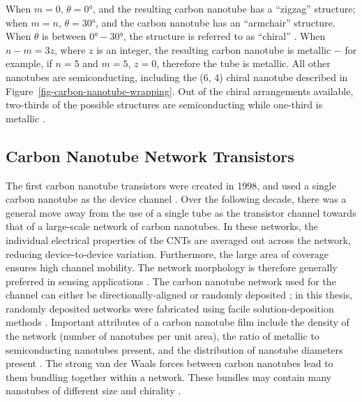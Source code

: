 \documentclass[
  a4paper,
]{scrbook}
\begin{document}
When \(m= 0\), \(\theta = 0°\), and the resulting carbon nanotube has a
``zigzag'' structure; when \(m = n\), \(\theta = 30°\), and the carbon
nanotube has an ``armchair'' structure. When \(\theta\) is between
\(0°-30°\), the structure is referred to as ``chiral''
\autocite{Dekker1999,Lu2012}. When \(n-m = 3z\), where \(z\) is an
integer, the resulting carbon nanotube is metallic \(-\) for example, if
\(n=5\) and \(m=5\), \(z=0\), therefore the tube is metallic. All other
nanotubes are semiconducting, including the (6, 4) chiral nanotube
described in Figure~\ref{fig-carbon-nanotube-wrapping}. Out of the
chiral arrangements available, two-thirds of the possible structures are
semiconducting while one-third is metallic \autocite{Dekker1999}.

\hypertarget{sec-cnt-network-details}{%
\subsection{Carbon Nanotube Network
Transistors}\label{sec-cnt-network-details}}

The first carbon nanotube transistors were created in 1998, and used a
single carbon nanotube as the device channel
\autocite{Martel1998,Tans1998,Kauffman2008}. Over the following decade,
there was a general move away from the use of a single tube as the
transistor channel towards that of a large-scale network of carbon
nanotubes. In these networks, the individual electrical properties of
the CNTs are averaged out across the network, reducing device-to-device
variation. Furthermore, the large area of coverage ensures high channel
mobility. The network morphology is therefore generally preferred in
sensing applications \autocite{Hu2004,Cao2009,Murugathas2019,Li2023}.
The carbon nanotube network used for the channel can either be
directionally-aligned or randomly deposited
\autocite{Cao2009,Shkodra2021}; in this thesis, randomly deposited
networks were fabricated using facile solution-deposition methods
\autocite{Zheng2017,Cassie2023}. Important attributes of a carbon
nanotube film include the density of the network (number of nanotubes
per unit area), the ratio of metallic to semiconducting nanotubes
present, and the distribution of nanotube diameters present
\autocite{Cao2009,Shkodra2021}. The strong van der Waals forces between
carbon nanotubes lead to them bundling together within a network. These
bundles may contain many nanotubes of different size and chirality
\autocite{Fuhrer2000,Hu2004,Cao2009,Murugathas2019}.
\end{document}
